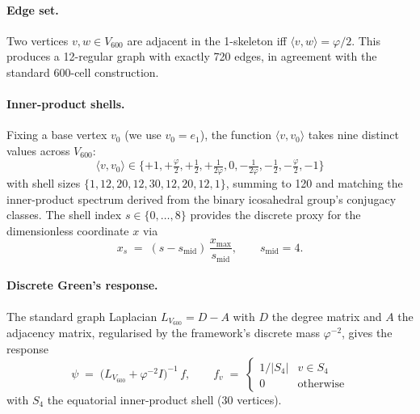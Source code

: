 \paragraph{Edge set.} Two vertices $v, w\in V_{600}$ are adjacent in
the 1-skeleton iff $\langle v, w\rangle = \varphi/2$. This produces a
12-regular graph with exactly 720 edges, in agreement with the standard
600-cell construction.

\paragraph{Inner-product shells.} Fixing a base vertex $v_{0}$ (we use
$v_{0}=e_{1}$), the function $\langle v, v_{0}\rangle$ takes nine
distinct values across $V_{600}$:
\begin{equation}\label{eq:shells}
\langle v, v_{0}\rangle \in
\{+1, +\tfrac{\varphi}{2}, +\tfrac{1}{2}, +\tfrac{1}{2\varphi}, 0,
   -\tfrac{1}{2\varphi}, -\tfrac{1}{2}, -\tfrac{\varphi}{2}, -1\}
\end{equation}
with shell sizes
$\{1, 12, 20, 12, 30, 12, 20, 12, 1\}$, summing to 120 and matching the
inner-product spectrum derived from the binary icosahedral group's
conjugacy classes. The shell index $s\in\{0,\dots,8\}$ provides the
discrete proxy for the dimensionless coordinate $x$ via
\begin{equation}\label{eq:x_shell}
x_{s} \;=\; (s - s_{\mathrm{mid}})\, \frac{x_{\max}}{s_{\mathrm{mid}}},
\qquad s_{\mathrm{mid}}=4.
\end{equation}

\paragraph{Discrete Green's response.} The standard graph Laplacian
$L_{V_{600}} = D - A$ with $D$ the degree matrix and $A$ the adjacency
matrix, regularised by the framework's discrete mass $\varphi^{-2}$,
gives the response
\begin{equation}\label{eq:psi_discrete}
\psi \;=\; \bigl(L_{V_{600}} + \varphi^{-2} I\bigr)^{-1}\, f,
\qquad
f_{v} \;=\; \begin{cases}1/|S_{4}| & v\in S_{4} \\ 0 & \text{otherwise}\end{cases}
\end{equation}
with $S_{4}$ the equatorial inner-product shell (30 vertices).

